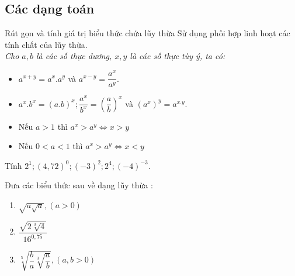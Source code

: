 \subsection{Các dạng toán}
\begin{dang}{Rút gọn và tính giá trị biểu thức chứa  lũy thừa}
Sử dụng phối hợp linh hoạt các tính chất của lũy thừa. \\
\textit{Cho $a, b$ là các số thực dương, $x, y$ là các số thực tùy ý, ta có:}
\begin{itemize}
	\item ${a}^{x+y}=a^x.a^y$ và ${a}^{x-y}=\dfrac{a^x}{a^y}$.
	\item $a^x.b^x=(a.b)^x; \dfrac{a^x}{b^x}={\left(\dfrac{a}{b}\right)}^x$ và $(a^x)^y={a}^{x.y}$.
	\item Nếu $a>1$ thì $a^x>a^y\Leftrightarrow x>y$
	\item Nếu $0<a<1$ thì $a^x>a^y\Leftrightarrow x<y$
\end{itemize}

\end{dang}
\begin{vd}%
Tính $2^1;(4,72)^0;(-3)^2;2^4;(-4)^{-3}$.
\end{vd}
\begin{vd}%
	Đưa các biểu thức sau về dạng lũy thừa : 
	\begin{multicols}{3}
		\begin{enumerate}
			\item $\sqrt{a\sqrt{a}} , \left(a>0\right)$
			\item  $\dfrac{\sqrt{2\sqrt[3]{4}}}{{16}^{0,75}}$
			\item $\sqrt[5]{\dfrac{b}{a}\sqrt[3]{\dfrac{a}{b}}},\left(a,b>0\right)$	
			\end{enumerate}
	\end{multicols} 
\end{vd}

